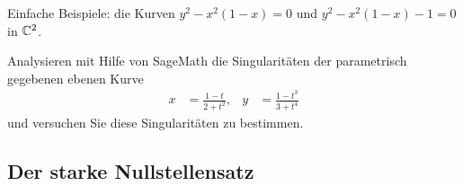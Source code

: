 \documentclass[11pt]{article}
\numberwithin{equation}{section}
\begin{document}
\begin{beispiel} 
	Einfache Beispiele: die Kurven  $y^2 - x^2 (1-x) =0$ und $y^2 - x^2 (1-x) -1 = 0$ in $\mathbb{C}^2$. 
\end{beispiel} 

\begin{aufgabe} 
	Analysieren mit Hilfe von SageMath die Singularitäten der parametrisch gegebenen ebenen Kurve 
	\begin{align*}
			x & = \frac{1-t}{2+t^2},
			& y & = \frac{1-t^3}{3+t^4}
	\end{align*} 
	und versuchen Sie diese Singularitäten zu bestimmen. 
\end{aufgabe} 

\subsection{Der starke Nullstellensatz} 
\end{document}
